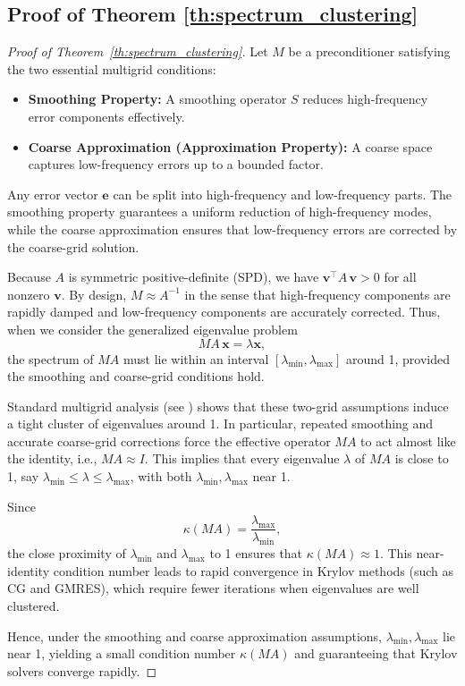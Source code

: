 \subsection{Proof of Theorem \ref{th:spectrum_clustering}} \label{appendix:proof_3}
\begin{proof}[Proof of Theorem~\ref{th:spectrum_clustering}]
Let \(M\) be a preconditioner satisfying the two essential multigrid conditions:
\begin{itemize}
    \item \textbf{Smoothing Property:} A smoothing operator \(S\) reduces high-frequency error components effectively.
    \item \textbf{Coarse Approximation (Approximation Property):} A coarse space captures low-frequency errors up to a bounded factor.
\end{itemize}

Any error vector \(\mathbf{e}\) can be split into high-frequency and low-frequency parts. The smoothing property guarantees a uniform reduction of high-frequency modes, while the coarse approximation ensures that low-frequency errors are corrected by the coarse-grid solution.

Because \(A\) is symmetric positive-definite (SPD), we have \(\mathbf{v}^\top A\,\mathbf{v} > 0\) for all nonzero \(\mathbf{v}\). By design, \(M\approx A^{-1}\) in the sense that high-frequency components are rapidly damped and low-frequency components are accurately corrected. Thus, when we consider the generalized eigenvalue problem
\[
    MA\,\mathbf{x} = \lambda \mathbf{x},
\]
the spectrum of \(MA\) must lie within an interval \([\lambda_{\min}, \lambda_{\max}]\) around 1, provided the smoothing and coarse-grid conditions hold. 

Standard multigrid analysis (see \cite{00:tutorial}) shows that these two-grid assumptions induce a tight cluster of eigenvalues around 1. In particular, repeated smoothing and accurate coarse-grid corrections force the effective operator \(MA\) to act almost like the identity, i.e., \(MA \approx I\). This implies that every eigenvalue \(\lambda\) of \(MA\) is close to 1, say \( \lambda_{\min} \le \lambda \le \lambda_{\max} \), with both \(\lambda_{\min}, \lambda_{\max}\) near 1.

Since 
\[
    \kappa(MA) = \frac{\lambda_{\max}}{\lambda_{\min}},
\]
the close proximity of \(\lambda_{\min}\) and \(\lambda_{\max}\) to 1 ensures that \(\kappa(MA)\approx 1\). This near-identity condition number leads to rapid convergence in Krylov methods (such as CG and GMRES), which require fewer iterations when eigenvalues are well clustered.

Hence, under the smoothing and coarse approximation assumptions, \(\lambda_{\min}, \lambda_{\max}\) lie near 1, yielding a small condition number \(\kappa(MA)\) and guaranteeing that Krylov solvers converge rapidly.
\end{proof}
